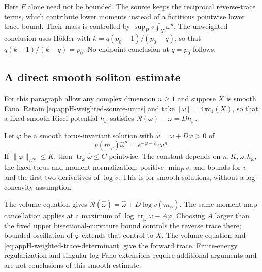 Here $F$ alone need not be bounded. The source keeps the reciprocal
reverse-trace terms, which contribute lower moments instead of a
fictitious pointwise lower trace bound. Their mass is controlled by
$\sup_Pv\int_X\omega^n$. The unweighted conclusion uses H\"older
with $k=q(p_0-1)/(p_0-q)$, so that
$q(k-1)/(k-q)=p_0$. No endpoint conclusion at $q=p_0$ follows.

\subsection{A direct smooth soliton estimate}

For this paragraph allow any complex dimension $n\geq1$ and suppose
$X$ is smooth Fano. Retain \eqref{eq:appH-weighted-source-units}
and take $[\omega]=4\pi c_1(X)$, so that a fixed smooth Ricci
potential $h_\omega$ satisfies
$\mathcal R(\omega)-\omega=Dh_\omega$.

\begin{theorem}\label{thm:appH-positive-weight-soliton}
Let $\varphi$ be a smooth torus-invariant solution with
$\widehat\omega=\omega+D\varphi>0$ of
\[
 v(m_\varphi)\widehat\omega^n
       =e^{-\varphi+h_\omega}\omega^n.
 \tag{H.118}\label{eq:appH-positive-weight-soliton}
\]
If $\|\varphi\|_{L^\infty}\leq K$, then
$\operatorname{tr}_\omega\widehat\omega\leq C$ pointwise.
The constant depends on $n,K,\omega,h_\omega$, the fixed torus and
moment normalization, positive $\min_Pv$, and bounds for $v$ and
the first two derivatives of $\log v$.
This is \cite[Theorem~3.1]{JubertPan26PositiveWeightsV1} for smooth
solutions, without a log-concavity assumption.
\end{theorem}

The volume equation gives
$\mathcal R(\widehat\omega)=\widehat\omega+D\log v(m_\varphi)$.
The same moment-map cancellation applies at a maximum of
$\log\operatorname{tr}_{\widehat\omega}\omega-A\varphi$.
Choosing $A$ larger than the fixed upper bisectional-curvature bound
controls the reverse trace there; bounded oscillation of $\varphi$
extends that control to $X$. The volume equation and
\eqref{eq:appH-weighted-trace-determinant} give the forward trace.
Finite-energy regularization and singular log-Fano extensions require
additional arguments and are not conclusions of this smooth estimate.

